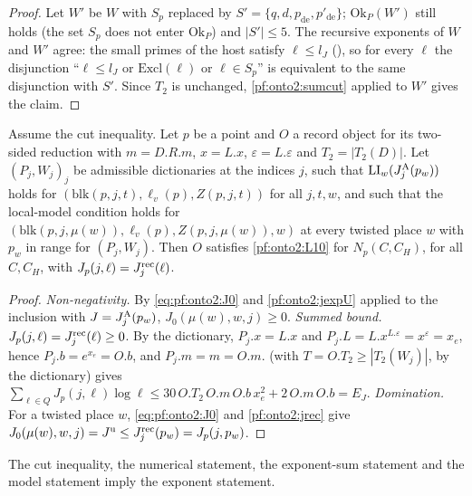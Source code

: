 \begin{proof}
Let $W'$ be $W$ with $S_p$ replaced by $S'=\{q,d,p_{\mathrm{de}},p'_{\mathrm{de}}\}$; $\mathrm{Ok}_P(W')$ still holds (the set $S_p$ does
not enter $\mathrm{Ok}_P$) and $|S'|\le5$. The recursive exponents of $W$ and $W'$ agree: the small primes of the host satisfy $\ell\le l_J$
(), so for every $\ell$ the disjunction ``$\ell\le l_J$ or $\mathrm{Excl}(\ell)$ or $\ell\in S_p$''
is equivalent to the same disjunction with $S'$. Since $T_2$ is unchanged, \cref{pf:onto2:sumcut} applied to $W'$ gives the claim.
\end{proof}

\begin{lemma}\label{pf:onto2:hasexp}
Assume the cut inequality. Let $p$ be a point and $O$ a record object for its two-sided reduction with $m=D.R.m$, $x=L.x$,
$\varepsilon=L.\varepsilon$ and $T_2=|T_2(D)|$. Let $(P_j,W_j)_j$ be admissible dictionaries at the indices $j$, such that
$\mathrm{LI}_w(J^{\mathrm{A}}_j(p_w))$ holds for $(\mathrm{blk}(p,j,t),\ell_v(p),Z(p,j,t))$ for all $j,t,w$, and such that the local-model
condition holds for $(\mathrm{blk}(p,j,\mu(w)),\ell_v(p),Z(p,j,\mu(w)),w)$ at every twisted place $w$ with $p_w$ in range for $(P_j,W_j)$.
Then $O$ satisfies \ref{pf:onto2:L10} for $N_p(C,C_H)$, for all $C,C_H$, with $J_p(j,\ell)=J^{\mathrm{rec}}_j(\ell)$.
\end{lemma}

\begin{proof}
\emph{Non-negativity.} By \eqref{eq:pf:onto2:J0} and \cref{pf:onto2:jexpU} applied to the inclusion with $J=J^{\mathrm{A}}_j(p_w)$,
$J_0(\mu(w),w,j)\ge0$. \emph{Summed bound.} $J_p(j,\ell)=J^{\mathrm{rec}}_j(\ell)\ge0$. By the dictionary, $P_j.x=L.x$ and
$P_j.L=L.x^{L.\varepsilon}=x^\varepsilon=x_e$, hence $P_j.b=e^{x_e}=O.b$, and $P_j.m=m=O.m$.  (with $T=O.T_2\ge|T_2(W_j)|$,
by the dictionary) gives $\sum_{\ell\in Q}J_p(j,\ell)\log\ell\le30\,O.T_2\,O.m\,O.b\,x_e^2+2\,O.m\,O.b=E_J$. \emph{Domination.} For a twisted
place $w$, \eqref{eq:pf:onto2:J0} and \cref{pf:onto2:jrec} give $J_0(\mu(w),w,j)=J^{\mathrm{u}}\le J^{\mathrm{rec}}_j(p_w)=J_p(j,p_w)$.
\end{proof}

\begin{proposition}\label{pf:onto2:expst}
The cut inequality, the numerical statement, the exponent-sum statement and the model statement imply the exponent statement.
\end{proposition}

